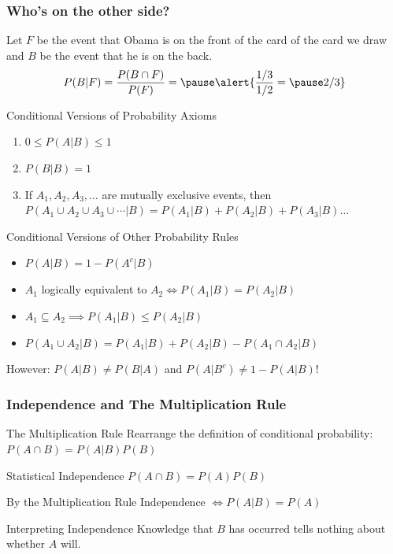\documentclass{beamer}
\begin{document}
\begin{frame}
\frametitle{Who's on the other side?}
Let $F$ be the event that Obama is on the front of the card of the card we draw and $B$ be the event that he is on the back.
$$P(B|F) = \frac{P(B\cap F)}{P(F)} = \pause \alert{\frac{1/3}{1/2}= \pause 2/3}$$

\end{frame}

\begin{frame}
  \small
  \begin{block}{Conditional Versions of Probability Axioms}
    \begin{enumerate}
      \item $0 \leq P(A|B) \leq 1$
      \item $P(B|B) = 1$
      \item If $A_1, A_2, A_3, \dots$ are mutually exclusive events, then $P(A_1\cup A_2\cup A_3 \cup \cdots|B) = P(A_1|B) + P(A_2|B) + P(A_3|B)\dots$
    \end{enumerate}
  \end{block}

  \begin{block}{Conditional Versions of Other Probability Rules}
    \begin{itemize}
      \item $P(A|B) = 1 - P(A^c|B)$
      \item $A_1$ logically equivalent to $A_2 \iff P(A_1|B) = P(A_2|B)$
      \item $A_1 \subseteq A_2 \implies P(A_1|B) \leq P(A_2|B)$  
      \item $P(A_1 \cup A_2 | B) = P(A_1|B) + P(A_2|B) - P(A_1 \cap A_2|B)$
    \end{itemize}
  \end{block}


    \alert{However: $P(A|B) \neq P(B|A)$ and $P(A|B^c) \neq 1 - P(A|B)$!}
  
\end{frame}
\begin{frame}
\frametitle{Independence and The Multiplication Rule}
\begin{block}{The Multiplication Rule}
Rearrange the definition of conditional probability:
$P(A\cap B) = P(A|B)P(B)$
\end{block}\pause
\begin{block}{Statistical Independence}
$P(A\cap B) = P(A)P(B)$
\end{block}\pause
\begin{alertblock}{By the Multiplication Rule}
$\mbox{Independence } \iff P(A|B) = P(A)$\\
\end{alertblock}\pause
\begin{block}{Interpreting Independence}
Knowledge that $B$ has occurred tells nothing about whether $A$ will.
\end{block}
\end{frame}
\end{document}
